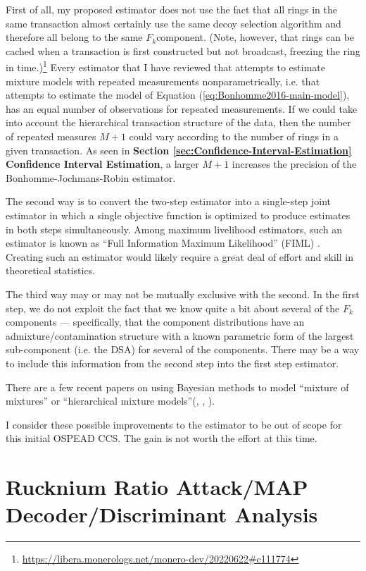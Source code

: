 \documentclass[english]{article}
\begin{document}
First of all, my proposed estimator does not use the fact that all
rings in the same transaction almost certainly use the same decoy
selection algorithm and therefore all belong to the same $F_{k}$component.
(Note, however, that rings can be cached when a transaction is first
constructed but not broadcast, freezing the ring in time.)\footnote{\href{https://libera.monerologs.net/monero-dev/20220622\#c111774}{https://libera.monerologs.net/monero-dev/20220622\#c111774}}
Every estimator that I have reviewed that attempts to estimate mixture
models with repeated measurements nonparametrically, i.e. that attempts
to estimate the model of Equation (\ref{eq:Bonhomme2016-main-model}),
has an equal number of observations for repeated measurements. If
we could take into account the hierarchical transaction structure
of the data, then the number of repeated measures $M+1$ could vary
according to the number of rings in a given transaction. As seen in
\textbf{Section \ref{sec:Confidence-Interval-Estimation} Confidence
Interval Estimation}, a larger $M+1$ increases the precision of the
Bonhomme-Jochmans-Robin estimator.

The second way is to convert the two-step estimator into a single-step
joint estimator in which a single objective function is optimized
to produce estimates in both steps simultaneously. Among maximum livelihood
estimators, such an estimator is known as ``Full Information Maximum
Likelihood'' (FIML) \cite{Murphy1985}. Creating such an estimator
would likely require a great deal of effort and skill in theoretical
statistics.

The third way may or may not be mutually exclusive with the second.
In the first step, we do not exploit the fact that we know quite a
bit about several of the $F_{k}$ components --- specifically, that
the component distributions have an admixture/contamination structure
with a known parametric form of the largest sub-component (i.e. the
DSA) for several of the components. There may be a way to include
this information from the second step into the first step estimator.

There are a few recent papers on using Bayesian methods to model ``mixture
of mixtures'' or ``hierarchical mixture models''(\cite{malsiner2017identifying},
\cite{Argiento2020}, \cite{Fruhwirth2021}).

I consider these possible improvements to the estimator to be out
of scope for this initial OSPEAD CCS. The gain is not worth the effort
at this time.

\section{Rucknium Ratio Attack/MAP Decoder/Discriminant Analysis\label{sec:Rucknium-Ratio-Attack}}
\end{document}
